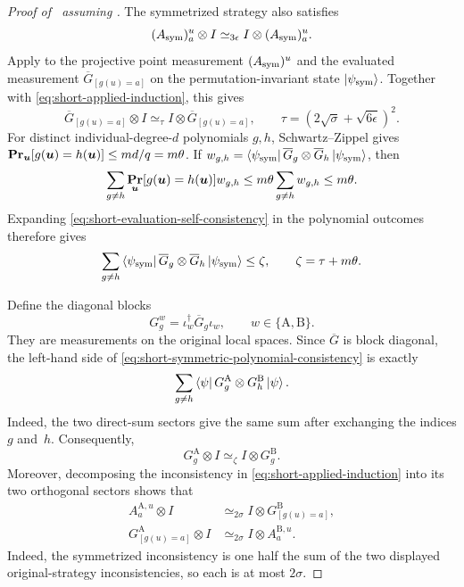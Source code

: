 \documentclass[11pt]{article}
\theoremstyle{definition}
\renewcommand{\Pr}{\mathop{\bf Pr\/}}
\newcommand{\eps}{\epsilon}
\newcommand{\bu}{\boldsymbol{u}}
\begin{document}
\begin{proof}[Proof of~ assuming ]
The symmetrized strategy also satisfies
\[
 (A_{\rm sym})^u_a\otimes I
 \simeq_{3\eps}I\otimes(A_{\rm sym})^u_a.
\]
Apply  to the projective point
measurement $(A_{\rm sym})^u$ and the evaluated measurement
$\overline G_{[g(u)=a]}$ on the permutation-invariant state
$\ket{\psi_{\rm sym}}$.  Together with
\eqref{eq:short-applied-induction}, this gives
\begin{equation}\label{eq:short-evaluation-self-consistency}
 \overline G_{[g(u)=a]}\otimes I
 \simeq_\tau I\otimes\overline G_{[g(u)=a]},
 \qquad
 \tau=(2\sqrt\sigma+\sqrt{6\eps})^2.
\end{equation}
For distinct individual-degree-\(d\) polynomials \(g,h\),
Schwartz--Zippel gives
\(\Pr_{\bu}[g(\bu)=h(\bu)]\leq md/q=m\theta\).  If
\(w_{g,h}=\bra{\psi_{\rm sym}}\overline G_g\otimes\overline G_h
\ket{\psi_{\rm sym}}\), then
\[
 \sum_{g\ne h}\Pr_{\bu}[g(\bu)=h(\bu)]w_{g,h}
 \leq m\theta\sum_{g\ne h}w_{g,h}\leq m\theta.
\]
Expanding \eqref{eq:short-evaluation-self-consistency} in the
polynomial outcomes therefore gives
\begin{equation}\label{eq:short-symmetric-polynomial-consistency}
 \sum_{g\ne h}
 \bra{\psi_{\rm sym}}\overline G_g\otimes\overline G_h
 \ket{\psi_{\rm sym}}
 \leq\zeta,
 \qquad
 \zeta=\tau+m\theta.
\end{equation}

Define the diagonal blocks
\[
 G^w_g=\iota_w^\dagger\overline G_g\iota_w,
 \qquad w\in\{\mathrm A,\mathrm B\}.
\]
They are measurements on the original local spaces.  Since
\(\overline G\) is block diagonal, the left-hand side of
\eqref{eq:short-symmetric-polynomial-consistency} is exactly
\[
 \sum_{g\ne h}\bra\psi
 G^{\mathrm A}_g\otimes G^{\mathrm B}_h\ket\psi.
\]
Indeed, the two direct-sum sectors give the same sum after exchanging
the indices $g$ and~$h$.
Consequently,
\begin{equation}\label{eq:short-polynomial-consistency}
 G^{\mathrm A}_g\otimes I
 \simeq_\zeta I\otimes G^{\mathrm B}_g.
\end{equation}
Moreover, decomposing the inconsistency in
\eqref{eq:short-applied-induction} into its two orthogonal sectors
shows that
\begin{align}
 A^{\mathrm A,u}_a\otimes I
 &\simeq_{2\sigma}
 I\otimes G^{\mathrm B}_{[g(u)=a]},\label{eq:short-point-cons-a}\\
 G^{\mathrm A}_{[g(u)=a]}\otimes I
 &\simeq_{2\sigma}
 I\otimes A^{\mathrm B,u}_a.\label{eq:short-point-cons-b}
\end{align}
Indeed, the symmetrized inconsistency is one half the sum of the two
displayed original-strategy inconsistencies, so each is at most
\(2\sigma\).


\end{proof}
\end{document}
